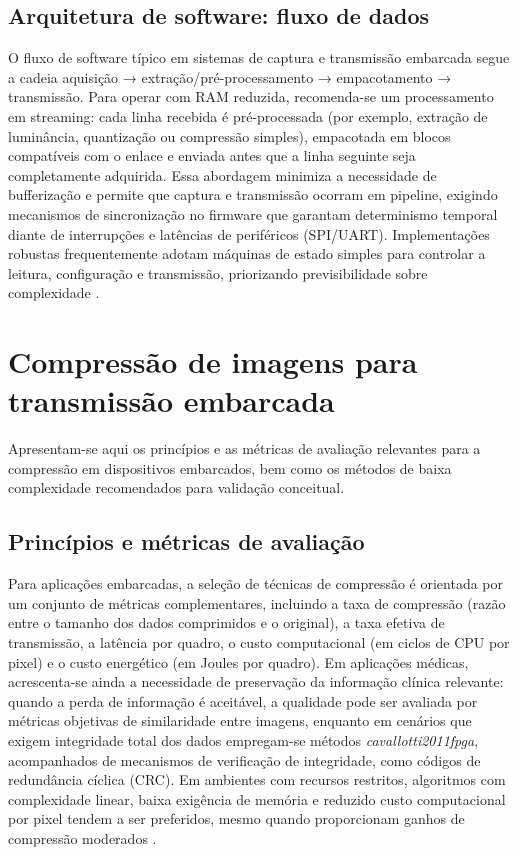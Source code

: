 \documentclass[repeatfields,xlists,xpacks,oneside]{ufrgscca}
\begin{document}
\subsection{Arquitetura de software: fluxo de dados}

O fluxo de software típico em sistemas de captura e transmissão embarcada segue a cadeia aquisição → extração/pré-processamento → empacotamento → transmissão. Para operar com RAM reduzida, recomenda-se um processamento em streaming: cada linha recebida é pré-processada (por exemplo, extração de luminância, quantização ou compressão simples), empacotada em blocos compatíveis com o enlace e enviada antes que a linha seguinte seja completamente adquirida. Essa abordagem minimiza a necessidade de bufferização e permite que captura e transmissão ocorram em pipeline, exigindo mecanismos de sincronização no firmware que garantam determinismo temporal diante de interrupções e latências de periféricos (SPI/UART). Implementações robustas frequentemente adotam máquinas de estado simples para controlar a leitura, configuração e transmissão, priorizando previsibilidade sobre complexidade \cite{cavallotti2011fpga}.

\section{Compressão de imagens para transmissão embarcada}

Apresentam-se aqui os princípios e as métricas de avaliação relevantes para a compressão em dispositivos embarcados, bem como os métodos de baixa complexidade recomendados para validação conceitual.

\subsection{Princípios e métricas de avaliação}

Para aplicações embarcadas, a seleção de técnicas de compressão é orientada por um conjunto de métricas complementares, incluindo a taxa de compressão (razão entre o tamanho dos dados comprimidos e o original), a taxa efetiva de transmissão, a latência por quadro, o custo computacional (em ciclos de CPU por pixel) e o custo energético (em Joules por quadro). Em aplicações médicas, acrescenta-se ainda a necessidade de preservação da informação clínica relevante: quando a perda de informação é aceitável, a qualidade pode ser avaliada por métricas objetivas de similaridade entre imagens, enquanto em cenários que exigem integridade total dos dados empregam-se métodos \textit{cavallotti2011fpga}, acompanhados de mecanismos de verificação de integridade, como códigos de redundância cíclica (CRC). Em ambientes com recursos restritos, algoritmos com complexidade linear, baixa exigência de memória e reduzido custo computacional por pixel tendem a ser preferidos, mesmo quando proporcionam ganhos de compressão moderados \textcite{cavallotti2011fpga}.%
\end{document}
